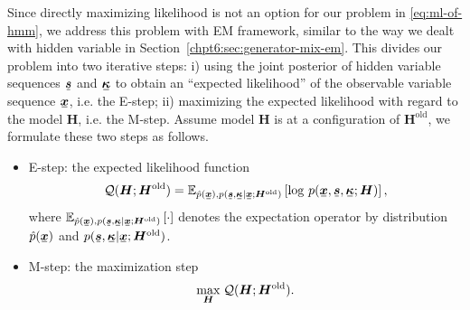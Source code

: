Since directly maximizing likelihood is not an option for our problem in \eqref{eq:ml-of-hmm}, we address this problem with EM framework, similar to the way we dealt with hidden variable in Section~\ref{chpt6:sec:generator-mix-em}. This divides our problem into  two iterative steps: i) using the joint posterior of hidden variable sequences $\ubm{s}$ and $\ubm{\kappa}$ to obtain an ``expected likelihood'' of the observable variable sequence $\ubm{x}$, i.e. the E-step; ii) maximizing the expected likelihood with regard to the model $\bm{H}$, i.e. the M-step. Assume model $\bm{H}$ is at a configuration of $\bm{H}^{\mathrm{old}}$, we formulate these two steps as follows.
\begin{itemize}
\item E-step: %
  the expected likelihood function
  \begin{equation}\label{eq:em-q-funciton}
    \Qq(\bm{H}; \bm{H}^{\mathrm{old}}) = \EE_{\hat{p}(\ubm{x}),p(\ubm{s},\ubm{\kappa}| \ubm{x}; \bm{H}^{\mathrm{old}})}\left[ \log\,p(\ubm{x}, \ubm{s}, \ubm{\kappa}; \bm{H})\right],
  \end{equation}
  where $\EE_{\hat{p}(\ubm{x}),p(\ubm{s},\ubm{\kappa}| \ubm{x}; \bm{H}^{\mathrm{old}})}\left[ \cdot\right]$ denotes the expectation operator by distribution $\hat{p}(\ubm{x})$ and $p(\ubm{s},\ubm{\kappa}| \ubm{x}; \bm{H}^{\mathrm{old}})$.
\item M-step: the maximization step
  \begin{equation}\label{eq:em-m-opt}
    \underset{\bm{H}}{\max}\; \mathcal{Q}(\bm{H}; \bm{H}^{\mathrm{old}}).
  \end{equation}
\end{itemize}


